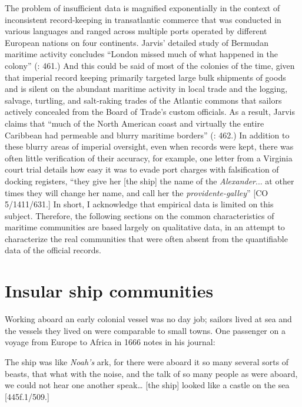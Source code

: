The problem of insufficient data is magnified exponentially in the context of inconsistent record-keeping in transatlantic commerce that was conducted in various languages and ranged across multiple ports operated by different European nations on four continents. Jarvis’ detailed study of Bermudan maritime activity concludes “London missed much of what happened in the colony” (\citealt{Jarvis2010}: 461.) And this could be said of most of the colonies of the time, given that imperial record keeping primarily targeted large bulk shipments of goods and is silent on the abundant maritime activity in local trade and the logging, salvage, turtling, and salt-raking trades of the Atlantic commons that sailors actively concealed from the Board of Trade’s custom officials. As a result, Jarvis claims that “much of the North American coast and virtually the entire Caribbean had permeable and blurry maritime borders” (\citealt{Jarvis2010}: 462.) In addition to these blurry areas of imperial oversight, even when records were kept, there was often little verification of their accuracy, for example, one letter from a Virginia court trial details how easy it was to evade port charges with falsification of docking registers, “they give her [the ship] the name of the \textit{Alexander}... at other times they will change her name, and call her the \textit{providente-galley}” [CO 5/1411/631.] In short, I acknowledge that empirical data is limited on this subject.  Therefore, the following sections on the common characteristics of maritime communities are based largely on qualitative data, in an attempt to characterize the real communities that were often absent from the quantifiable data of the official records.

\section{\textbf{Insular} \textbf{ship} \textbf{communities}}%

Working aboard an early colonial vessel was no day job; sailors lived at sea and the vessels they lived on were comparable to small towns. One passenger on a voyage from Europe to Africa in 1666 notes in his journal: 

The ship was like \textit{Noah’s} ark, for there were aboard it so many several sorts of beasts, that what with the noise, and the talk of so many people as were aboard, we could not hear one another speak… [the ship] looked like a castle on the sea [445f.1/509.]

